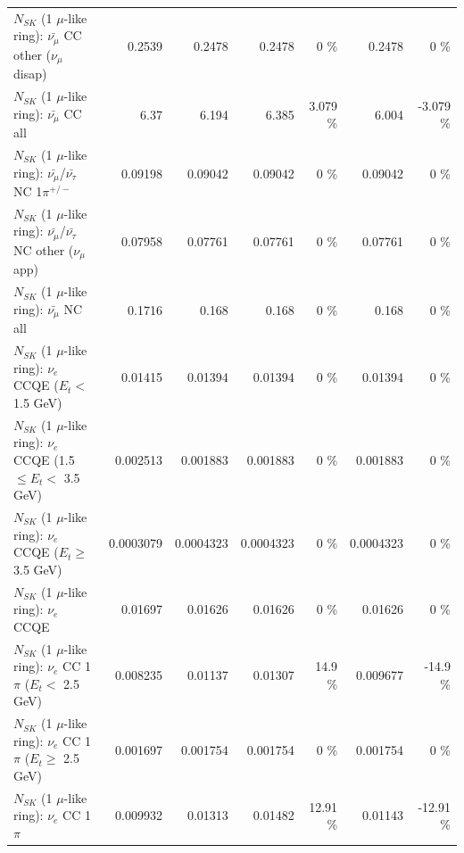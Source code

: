 \begin{table}
\begin{tabular}{| l | r | r | r  r | r  r |}
        $N_{SK}$ (1 $\mu$-like ring): $\bar{\nu_\mu}$ CC other ($\nu_\mu$ disap) &          0.2539 &          0.2478 &          0.2478 &        0 \%  &          0.2478 &        0 \%  \\ 
                          $N_{SK}$ (1 $\mu$-like ring): $\bar{\nu_{\mu}}$ CC all &            6.37 &           6.194 &           6.385 &    3.079 \%  &           6.004 &   -3.079 \%  \\ 
\hline
  $N_{SK}$ (1 $\mu$-like ring): $\bar{\nu_\mu}$/$\bar{\nu_\tau}$ NC 1$\pi^{+/-}$ &         0.09198 &         0.09042 &         0.09042 &        0 \%  &         0.09042 &        0 \%  \\ 
$N_{SK}$ (1 $\mu$-like ring): $\bar{\nu_\mu}$/$\bar{\nu_\tau}$ NC other ($\nu_\mu$ app) &         0.07958 &         0.07761 &         0.07761 &        0 \%  &         0.07761 &        0 \%  \\ 
                          $N_{SK}$ (1 $\mu$-like ring): $\bar{\nu_{\mu}}$ NC all &          0.1716 &           0.168 &           0.168 &        0 \%  &           0.168 &        0 \%  \\ 
\hline
\hline
\hline
                  $N_{SK}$ (1 $\mu$-like ring): $\nu_e$ CCQE ($E_{t} <$ 1.5 GeV) &         0.01415 &         0.01394 &         0.01394 &        0 \%  &         0.01394 &        0 \%  \\ 
         $N_{SK}$ (1 $\mu$-like ring): $\nu_e$ CCQE (1.5 $\leq E_{t} <$ 3.5 GeV) &        0.002513 &        0.001883 &        0.001883 &        0 \%  &        0.001883 &        0 \%  \\ 
               $N_{SK}$ (1 $\mu$-like ring): $\nu_e$ CCQE ($E_{t} \geq$ 3.5 GeV) &       0.0003079 &       0.0004323 &       0.0004323 &        0 \%  &       0.0004323 &        0 \%  \\ 
\hline
                                      $N_{SK}$ (1 $\mu$-like ring): $\nu_e$ CCQE &         0.01697 &         0.01626 &         0.01626 &        0 \%  &         0.01626 &        0 \%  \\ 
\hline
             $N_{SK}$ (1 $\mu$-like ring): $\nu_e$ CC 1$\pi$ ($E_{t} <$ 2.5 GeV) &        0.008235 &         0.01137 &         0.01307 &     14.9 \%  &        0.009677 &    -14.9 \%  \\ 
          $N_{SK}$ (1 $\mu$-like ring): $\nu_e$ CC 1$\pi$ ($E_{t} \geq$ 2.5 GeV) &        0.001697 &        0.001754 &        0.001754 &        0 \%  &        0.001754 &        0 \%  \\ 
\hline
                                 $N_{SK}$ (1 $\mu$-like ring): $\nu_e$ CC 1$\pi$ &        0.009932 &         0.01313 &         0.01482 &    12.91 \%  &         0.01143 &   -12.91 \%  \\ 

\end{tabular}
\end{table}
